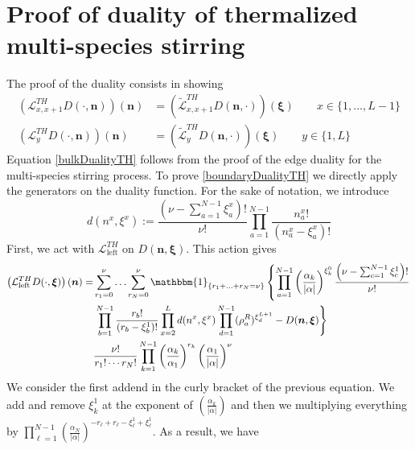 \documentclass[10pt]{article}
\numberwithin{equation}{section}
\numberwithin{equation}{subsection}
\begin{document}
\section{Proof of duality of thermalized multi-species stirring}\label{appendix-dualityThermalized}
The proof of the duality consists in showing
\begin{align}
	\left(\mathcal{L}_{x,x+1}^{TH}D(\cdot,\bm{n})\right)(\bm{n})&=\left(\widetilde{\mathcal{L}}_{x,x+1}^{TH}D(\bm{n},\cdot)\right)(\bm{\xi})\qquad x\in \{1,\ldots,L-1\}\label{bulkDualityTH}\\
	\left(\mathcal{L}_{y}^{TH}D(\cdot,\bm{n})\right)(\bm{n})&=\left(\widetilde{\mathcal{L}}_{y}^{TH}D(\bm{n},\cdot)\right)(\bm{\xi})\qquad y\in\{1,L\}\label{boundaryDualityTH}
\end{align}
Equation \eqref{bulkDualityTH} follows from the proof of the edge duality for the multi-species stirring process. To prove \eqref{boundaryDualityTH} we directly apply the generators on the duality function. For the sake of notation, we introduce 
\begin{equation}
	d(n^{x},\xi^{x}):=\frac{(\nu-\sum_{a=1}^{N-1}\xi_{a}^{x})!}{\nu!}\prod_{a=1}^{N-1}\frac{n_{a}^{x}!}{(n_{a}^{x}-\xi_{a}^{x})!}
\end{equation}
First, we act with $\mathcal{L}_{\text{left}}^{TH}$ on $D(\bm{n},\bm{\xi})$. This action gives
\begin{align}\label{ProvaBordoTH}
	\left(\mathcal{L}_{\text{left}}^{TH}D(\cdot,\bm{\xi})\right)(\bm{n})=\nonumber&\sum_{r_{1}=0}^{\nu}\ldots\sum_{r_{N}=0}^{\nu}\mathbbm{1}_{\{r_{1}+\ldots+r_{N}=\nu\}}\left\{\prod_{a=1}^{N-1}\left(\frac{\alpha_{k}}{|\alpha|}\right)^{\xi_{k}^{0}}\frac{\left(\nu-\sum_{c=1}^{N-1}\xi_{c}^{1}\right)!}{\nu!}\right.
	\\&\nonumber
	\left.\prod_{b=1}^{N-1}\frac{r_{b}!}{(r_{b}-\xi^{1}_{b})!}\prod_{x=2}^{L}d(n^{x},\xi^{x})\prod_{d=1}^{N-1}(\rho_{a}^{R})^{\xi_{d}^{L+1}}-D(\bm{n},\bm{\xi})\right\}
	\\&
	\frac{\nu!}{r_{1}!\cdots r_{N}!}\prod_{k=1}^{N-1}\left(\frac{\alpha_{k}}{\alpha_{1}}\right)^{r_{k}}\left(\frac{\alpha_{1}}{|\alpha|}\right)^{\nu}
\end{align}
We consider the first addend in the curly bracket of the previous equation. We add and remove $\xi_{k}^{1}$ at the exponent of $\left(\frac{\alpha_{k}}{|\alpha|}\right)$ and then we multiplying everything by $\prod_{\ell=1}^{N-1}\left(\frac{\alpha_{N}}{|\alpha|}\right)^{-r_{\ell}+r_{\ell}-\xi_{\ell}^{1}+\xi_{\ell}^{1}}$. As a result, we have
\end{document}
